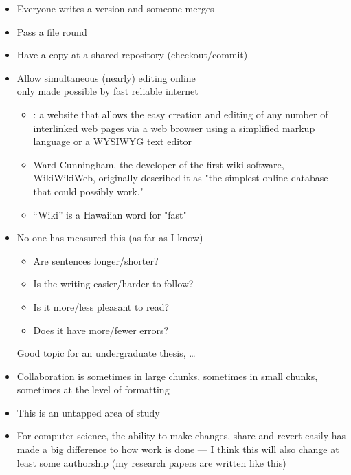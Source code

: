 \documentclass[a4paper,landscape,headrule,footrule,xetex]{foils}
\begin{document}

\begin{itemize}
\item Everyone writes a version and someone merges
\item Pass a file round
\item Have a copy at a shared repository (checkout/commit)
\item Allow simultaneous (nearly) editing online
  \\ only made possible by fast reliable internet
  \begin{itemize}
  \item  {}: a website that allows the easy creation and editing of any number of interlinked web pages via a web browser using a simplified markup language or a WYSIWYG text editor
  \item Ward Cunningham, the developer of the first wiki software, WikiWikiWeb, originally described it as "the simplest online database that could possibly work."
  \item ``Wiki'' is a Hawaiian word for "fast"
  \end{itemize}
\end{itemize}



\begin{itemize}
\item No one has measured this (as far as I know)
  \begin{itemize}
  \item Are sentences longer/shorter?
  \item Is the writing easier/harder to follow?
  \item Is it more/less pleasant to read?
  \item Does it have more/fewer errors?
  \end{itemize}
  Good topic for an undergraduate thesis, \ldots
\item Collaboration is sometimes in large chunks, sometimes in small
  chunks, sometimes at the level of formatting
\item This is an untapped area of study
\item For computer science, the ability to make changes, share and
  revert easily has made a big difference to how work is done --- I
  think this will also change at least some authorship (my research
  papers are written like this)
\end{itemize}
\end{document}
